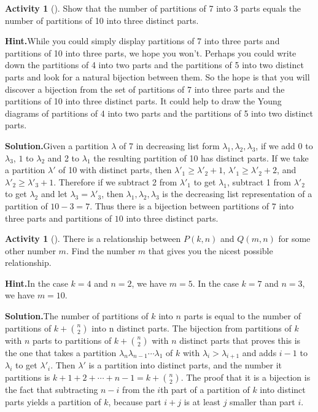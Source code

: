 \documentclass[10pt,]{book}
\theoremstyle{plain}
\theoremstyle{definition}
\newtheorem{activity}[project]{Activity}
\numberwithin{equation}{chapter}
\begin{document}
\begin{activity}[]\label{activity-161}
Show that the number of partitions of 7 into 3 parts equals the number of partitions of 10 into three distinct parts.%
\par\medskip\noindent%
\textbf{Hint.}\quad While you could simply display partitions of 7 into three parts and partitions of 10 into three parts, we hope you won’t. Perhaps you could write down the partitions of 4 into two parts and the partitions of 5 into two distinct parts and look for a natural bijection between them. So the hope is that you will discover a bijection from the set of partitions of 7 into three parts and the partitions of 10 into three distinct parts. It could help to draw the Young diagrams of partitions of 4 into two parts and the partitions of 5 into two distinct parts.%
\par\medskip\noindent%
\textbf{Solution.}\quad Given a partition \(\lambda\) of 7 in decreasing list form \(\lambda_1,\lambda_2,\lambda_3\), if we add 0 to \(\lambda_3\), \(1\) to \(\lambda_2\) and 2 to \(\lambda_1\) the resulting partition of 10 has distinct parts. If we take a partition \(\lambda'\) of 10 with distinct parts, then \(\lambda'_1\ge\lambda'_2+1\), \(\lambda'_1\ge\lambda'_2+2\), and \(\lambda'_2\ge \lambda'_3+1\). Therefore if we subtract 2 from \(\lambda'_1\) to get \(\lambda_1\), subtract 1 from \(\lambda'_2\) to get \(\lambda_2\) and let \(\lambda_3= \lambda'_3\), then \(\lambda_1,\lambda_2,\lambda_3\) is the decreasing list representation of a partition of \(10-3=7\). Thus there is a bijection between partitions of \(7\) into three parts and partitions of \(10\) into three distinct parts.%
\end{activity}
\begin{activity}[]\label{activity-162}
There is a relationship between \(P(k,n)\) and \(Q(m,n)\) for some other number \(m\). Find the number \(m\) that gives you the nicest possible relationship.%
\par\medskip\noindent%
\textbf{Hint.}\quad In the case \(k=4\) and \(n=2\), we have \(m=5\). In the case \(k = 7\) and \(n = 3\), we have \(m = 10\).%
\par\medskip\noindent%
\textbf{Solution.}\quad The number of partitions of \(k\) into \(n\) parts is equal to the number of partitions of \(k+\binom{n}{2}\) into n distinct parts.  The bijection from partitions of \(k\) with \(n\) parts to partitions of \(k+\binom{n}{2}\) with \(n\) distinct parts that proves this is the one that takes a partition \(\lambda_n\lambda_{n-1}\cdots\lambda_1\) of \(k\) with \(\lambda_i>\lambda_{i+1}\) and adds \(i-1\) to \(\lambda_i\) to get \(\lambda'_i\). Then \(\lambda'\) is a partition into distinct parts, and the number it partitions is \(k+1+2+\cdots+n-1=k+\binom{n}{2}\). The proof that it is a bijection is the fact that subtracting \(n-i\) from the \(i\)\/th part of a partition of \(k\) into distinct parts yields a partition of \(k\), because part \(i+j\) is at least \(j\) smaller than part \(i\).%
\end{activity}
\end{document}
